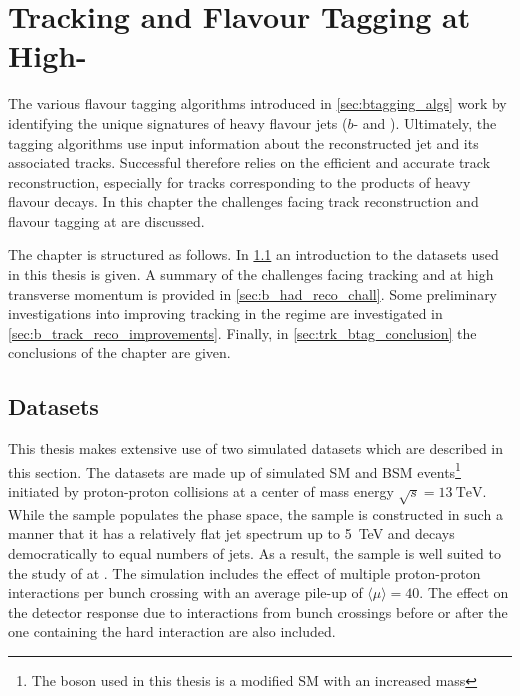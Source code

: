 \chapter{Tracking and Flavour Tagging at High-\texorpdfstring{\pt}{pt}}\label{chap:tracking}

The various flavour tagging algorithms introduced in \cref{sec:btagging_algs} work by identifying the unique signatures of heavy flavour jets ($b$- and \cjets).
Ultimately, the tagging algorithms use input information about the reconstructed jet and its associated tracks.
Successful \btagging therefore relies on the efficient and accurate track reconstruction, especially for tracks corresponding to the products of heavy flavour decays.
In this chapter the challenges facing track reconstruction and flavour tagging at \highpt are discussed.


The chapter is structured as follows.
In \cref{sec:track_classifier_datasets} an introduction to the datasets used in this thesis is given.
A summary of the challenges facing tracking and \btagging at high transverse momentum is provided in \cref{sec:b_had_reco_chall}.
Some preliminary investigations into improving tracking in the \highpt regime are investigated in \cref{sec:b_track_reco_improvements}.
Finally, in \cref{sec:trk_btag_conclusion} the conclusions of the chapter are given.


\section{Datasets}\label{sec:track_classifier_datasets}


\newcommand{\hdampFootnote}{%
The first gluon emission cut-off scale parameter $h_\text{damp}$ of the \textsc{PowhegBox} generator is used to limit the effect of resummed higher order corrections.%
It is used to suppress the transverse momentum of the radiation which the \ttbar system recoils against.%
}

This thesis makes extensive use of two simulated datasets which are described in this section.
The datasets are made up of simulated SM \ttbar and BSM \Zprime events\footnote{The \Zprime boson used in this thesis is a modified SM \Zboson with an increased mass} initiated by proton-proton collisions at a center of mass energy $\sqrt{s} = \SI{13}{\TeV}$.
While the \ttbar sample populates the \lowpt phase space, the \Zprime sample is constructed in such a manner that it has a relatively flat jet \pt spectrum up to \SI{5}{\TeV} and decays democratically to equal numbers of \bcl jets.
As a result, the \Zprime sample is well suited to the study of \btagging at \highpt.
The simulation includes the effect of multiple proton-proton interactions per bunch crossing with an average pile-up of $\langle \mu \rangle = 40$.
The effect on the detector response due to interactions from bunch crossings before or after the one containing the hard interaction are also included.

